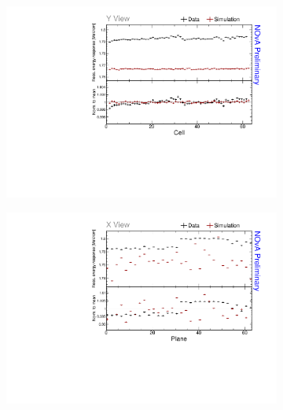 \begin{figure}[!ht]
\begin{subfigure}{0.495\textwidth}
  \end{subfigure}
  \begin{subfigure}{0.495\textwidth}
    \includegraphics[width=\linewidth]{Plots/PCListAna/DataAndSim_recomevcm_ts_cell_y.pdf}
  \end{subfigure}
    \begin{subfigure}{0.495\textwidth}
    \includegraphics[width=\linewidth]{Plots/PCListAna/DataAndSim_recomevcm_ts_plane_x.pdf}
  \end{subfigure}
  \begin{subfigure}{0.495\textwidth}

\end{subfigure}
\end{figure}
